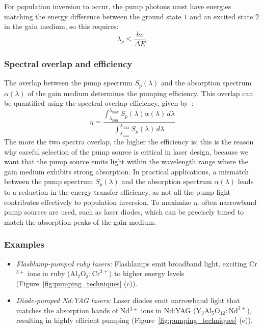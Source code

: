 \documentclass[prl,twocolumn]{revtex4-1}
\begin{document}
For population inversion to occur, the pump photons must have energies matching the energy difference between the ground state $1$ and an excited state $2$ in the gain medium, so this requires:
%
\begin{equation}
    \lambda_p \leq \frac{hc}{\Delta E}.
\end{equation}

\subsubsection{\textbf{Spectral overlap and efficiency}}
The overlap between the pump spectrum $S_p(\lambda)$ and the absorption spectrum $\alpha(\lambda)$ of the gain medium determines the pumping efficiency. This overlap can be quantified using the spectral overlap efficiency, given by~\cite{optical_pumping}:
%
\begin{equation}
    \eta = \frac{\int_{\lambda_{\text{min}}}^{\lambda_{\text{max}}} S_p(\lambda) \alpha(\lambda) \, d\lambda}{\int_{\lambda_{\text{min}}}^{\lambda_{\text{max}}} S_p(\lambda) \, d\lambda}
\end{equation}
%
The more the two spectra overlap, the higher the efficiency is; this is the reason why careful selection of the pump source is critical in laser design, because we want that the pump source emits light within the wavelength range where the gain medium exhibits strong absorption. In practical applications, a mismatch between the pump spectrum $S_p(\lambda)$ and the absorption spectrum $\alpha(\lambda)$ leads to a reduction in the energy transfer efficiency, as not all the pump light contributes effectively to population inversion. To maximize $\eta$, often narrowband pump sources are used, such as laser diodes, which can be precisely tuned to match the absorption peaks of the gain medium.

\subsubsection{\textbf{Examples}}
\begin{itemize}
  \item \textit{Flashlamp-pumped ruby lasers:} Flashlamps emit broadband light, exciting Cr$^{3+}$ ions in ruby ($\text{Al}_2\text{O}_3: \text{Cr}^{3+}$) to higher energy levels (Figure~\ref{fig:pumping_techniques} (c)).
  \item \textit{Diode-pumped Nd:YAG lasers:} Laser diodes emit narrowband light that matches the absorption bands of Nd$^{3+}$ ions in Nd:YAG ($\text{Y}_3\text{Al}_5\text{O}_{12}:\text{Nd}^{3+}$), resulting in highly efficient pumping (Figure~\ref{fig:pumping_techniques} (e)).
\end{itemize}
\end{document}
